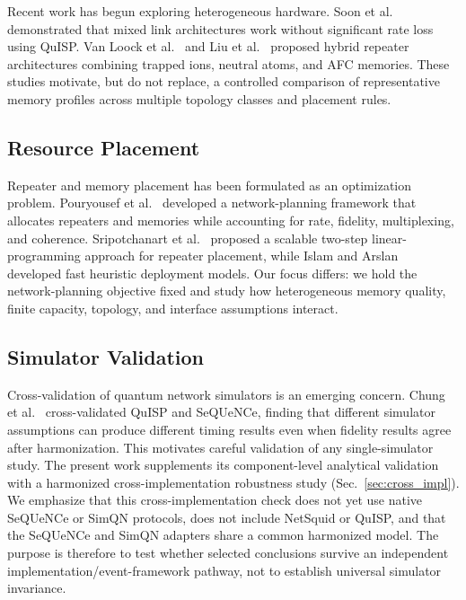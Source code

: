 \documentclass[quantumrep,article,submit,moreauthors]{Definitions/mdpi}
\begin{document}
Recent work has begun exploring heterogeneous hardware. Soon et al.~\cite{sharma2024heterogeneous} demonstrated that mixed link architectures work without significant rate loss using QuISP. Van Loock et al.~\cite{van2025hybrid} and Liu et al.~\cite{liu2025hybrid} proposed hybrid repeater architectures combining trapped ions, neutral atoms, and AFC memories. These studies motivate, but do not replace, a controlled comparison of representative memory profiles across multiple topology classes and placement rules.

\subsection{Resource Placement}

Repeater and memory placement has been formulated as an optimization problem. Pouryousef et al.~\cite{pouryousef2024resource} developed a network-planning framework that allocates repeaters and memories while accounting for rate, fidelity, multiplexing, and coherence. Sripotchanart et al.~\cite{sripotchanart2024twostep} proposed a scalable two-step linear-programming approach for repeater placement, while Islam and Arslan~\cite{islam2023scalable} developed fast heuristic deployment models. Our focus differs: we hold the network-planning objective fixed and study how heterogeneous memory quality, finite capacity, topology, and interface assumptions interact.

\subsection{Simulator Validation}

Cross-validation of quantum network simulators is an emerging concern. Chung et al.~\cite{vittal2025cross} cross-validated QuISP and SeQUeNCe, finding that different simulator assumptions can produce different timing results even when fidelity results agree after harmonization. This motivates careful validation of any single-simulator study. The present work supplements its component-level analytical validation with a harmonized cross-implementation robustness study (Sec.~\ref{sec:cross_impl}). We emphasize that this cross-implementation check does not yet use native SeQUeNCe or SimQN protocols, does not include NetSquid or QuISP, and that the SeQUeNCe and SimQN adapters share a common harmonized model. The purpose is therefore to test whether selected conclusions survive an independent implementation/event-framework pathway, not to establish universal simulator invariance.
\end{document}
